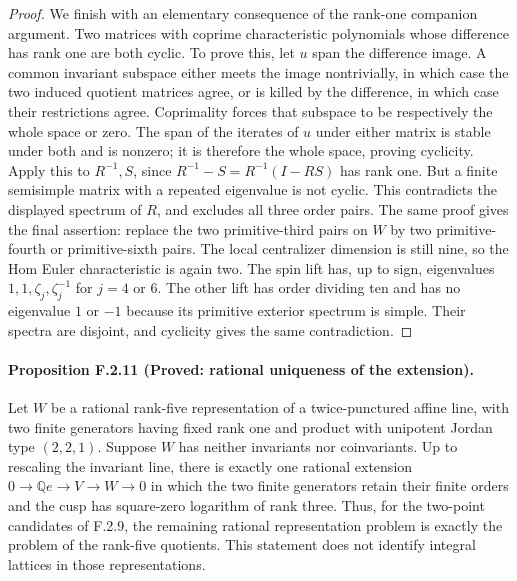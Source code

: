 \begin{proof}
We finish with an elementary consequence of the rank-one
companion argument.  Two matrices with coprime characteristic
polynomials whose difference has rank one are both cyclic.
To prove this, let $u$ span the difference image.
A common invariant subspace either meets the image nontrivially,
in which case the two induced quotient matrices agree, or is
killed by the difference, in which case their restrictions
agree.  Coprimality forces that subspace to be respectively
the whole space or zero.  The span of the iterates of $u$
under either matrix is stable under both and is nonzero;
it is therefore the whole space, proving cyclicity.
Apply this to $R^{-1},S$, since
$R^{-1}-S=R^{-1}(I-RS)$ has rank one.
But a finite semisimple matrix with a repeated eigenvalue
is not cyclic.  This contradicts the displayed spectrum of
$R$, and excludes all three order pairs.
The same proof gives the final assertion: replace the two
primitive-third pairs on $W$ by two primitive-fourth or
primitive-sixth pairs.  The local centralizer dimension
is still nine, so the Hom Euler characteristic is again two.
The spin lift has, up to sign, eigenvalues
$1,1,\zeta_j,\zeta_j^{-1}$ for $j=4$ or $6$.
The other lift has order dividing ten and has no eigenvalue
$1$ or $-1$ because its primitive exterior spectrum is
simple.  Their spectra are disjoint, and cyclicity gives
the same contradiction.
\end{proof}

\paragraph{Proposition F.2.11 (Proved: rational uniqueness of the extension).}
Let $W$ be a rational rank-five representation of a
twice-punctured affine line, with two finite generators
having fixed rank one and product with unipotent Jordan type
$(2,2,1)$.  Suppose $W$ has neither invariants nor
coinvariants.  Up to rescaling the invariant line, there is
exactly one rational extension
$0\to\mathbb Qe\to V\to W\to0$ in which the two finite
generators retain their finite orders and the cusp has
square-zero logarithm of rank three.  Thus, for the
two-point candidates of F.2.9, the remaining rational
representation problem is exactly the problem of the
rank-five quotients.  This statement does not identify
integral lattices in those representations.

